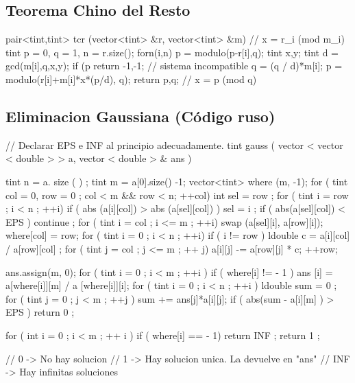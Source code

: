 \subsection{Teorema Chino del Resto}

\begin{code}

pair<tint,tint> tcr (vector<tint> &r, vector<tint> &m) // x = r_i (mod m_i)
{
	tint p = 0, q = 1, n = r.size();
	forn(i,n)
	{
		p = modulo(p-r[i],q);
		tint x,y;
		tint d = gcd(m[i],q,x,y);
		if (p %
		return {-1,-1}; // sistema incompatible
		q = (q / d)*m[i];
		p = modulo(r[i]+m[i]*x*(p/d), q);
	}
	return {p,q}; // x = p (mod q)
}


\end{code}


\subsection{Eliminacion Gaussiana (Código ruso)}
\begin{code}
// Declarar EPS e INF al principio adecuadamente.
tint gauss ( vector < vector < double > > a, vector < double > & ans ) {
	tint n = a. size ( ) ;
	tint m = a[0].size() -1;
	vector<tint> where (m, -1);
	for ( tint col = 0, row = 0 ; col < m && row < n; ++col)
	{
		int sel = row ;
		for ( tint i = row ; i < n ; ++i)
			if ( abs (a[i][col]) > abs (a[sel][col]) )
				sel = i ;
		if ( abs(a[sel][col]) < EPS )
			continue ;
		for ( tint i = col ; i <= m ; ++i)
			swap (a[sel][i], a[row][i]);
		where[col] = row;
		for ( tint i = 0 ; i < n ; ++i)
			if ( i != row ) 
			{
				ldouble c = a[i][col] / a[row][col] ;
				for ( tint j = col ; j <= m ; ++ j)
					a[i][j] -= a[row][j] * c;
			}
		++row;
	}
 
	ans.assign(m, 0);
	for ( tint i = 0 ; i < m ; ++i )
		if ( where[i] != - 1 )
			ans [i] = a[where[i]][m] / a [where[i]][i];
	for ( tint i = 0 ; i < n ; ++i ) 
	{
		ldouble sum = 0 ;
		for ( tint j = 0 ; j < m ; ++j )
			sum += ans[j]*a[i][j];
		if ( abs(sum - a[i][m] ) > EPS )
			return 0 ;
	}
 
	for ( int i = 0 ; i < m ; ++ i )
		if ( where[i] == - 1)
			return INF ;
	return 1 ;
}

// 0 -> No hay solucion
// 1 -> Hay solucion unica. La devuelve en "ans"
// INF -> Hay infinitas soluciones

\end{code}

